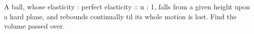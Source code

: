 A ball, whose elasticity : perfect elasticity :: n : 1,
falls from a given height upon a hard plane,
and rebounds continually til its whole motion is lost. 
Find the volume passed over.
